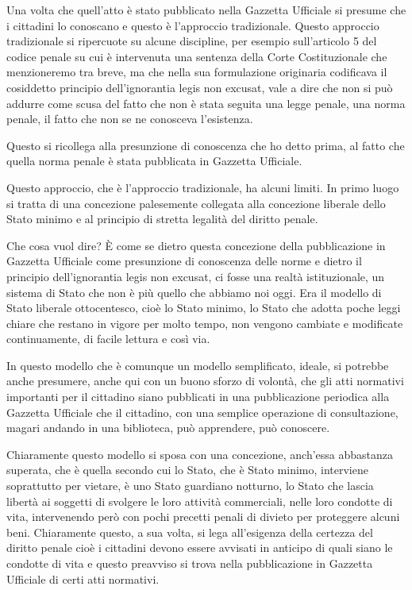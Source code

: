 Una volta che quell'atto è stato pubblicato nella Gazzetta Ufficiale si presume che i cittadini lo conoscano e questo è l'approccio tradizionale. Questo approccio tradizionale si ripercuote su alcune discipline, per esempio sull'articolo 5 del codice penale su cui è intervenuta una sentenza della Corte Costituzionale che menzioneremo tra breve, ma che nella sua formulazione originaria codificava il cosiddetto principio dell'ignorantia legis non excusat, vale a dire che non si può addurre come scusa del fatto che non è stata seguita una legge penale, una norma penale, il fatto che non se ne conosceva l'esistenza.

Questo si ricollega alla presunzione di conoscenza che ho detto prima, al fatto che quella norma penale è stata pubblicata in Gazzetta Ufficiale. 

Questo approccio, che è l'approccio tradizionale, ha alcuni limiti. In primo luogo si tratta di una concezione palesemente collegata alla concezione liberale dello Stato minimo e al principio di stretta legalità del diritto penale.

Che cosa vuol dire? È come se dietro questa concezione della pubblicazione in Gazzetta Ufficiale come presunzione di conoscenza delle norme e dietro il principio dell'ignorantia legis non excusat, ci fosse una realtà istituzionale, un sistema di Stato che non è più quello che abbiamo noi oggi. Era  il modello di Stato liberale ottocentesco, cioè lo Stato minimo, lo Stato che adotta poche leggi chiare che restano in vigore per molto tempo, non vengono cambiate e modificate continuamente, di facile lettura e così via.

In questo modello che è comunque un modello semplificato, ideale, si potrebbe anche presumere, anche qui con un buono sforzo di volontà, che gli atti normativi importanti per il cittadino siano pubblicati in una pubblicazione periodica alla Gazzetta Ufficiale che il cittadino, con una semplice operazione di consultazione, magari andando in una biblioteca, può apprendere, può conoscere.

Chiaramente questo modello si sposa con una concezione, anch'essa abbastanza superata, che è quella secondo cui lo Stato, che è Stato minimo, interviene soprattutto per vietare, è uno Stato guardiano notturno, lo Stato che lascia libertà ai soggetti di svolgere le loro attività commerciali, nelle loro condotte di vita, intervenendo però con pochi precetti penali di divieto per proteggere alcuni beni. Chiaramente questo, a sua volta, si lega all'esigenza della certezza del diritto penale cioè i cittadini devono essere avvisati in anticipo di quali siano le condotte di vita e questo preavviso si trova nella pubblicazione in Gazzetta Ufficiale di certi atti normativi.


